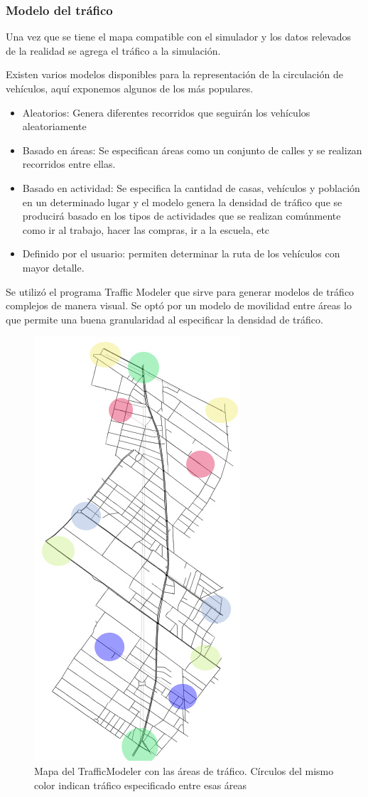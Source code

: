 \newpage
\subsubsection{Modelo del tráfico}
Una vez que se tiene el mapa compatible con el simulador y los datos relevados de la realidad se agrega el tráfico a la simulación.

Existen varios modelos disponibles para la representación de la circulación de vehículos, aquí exponemos algunos de los más populares. 
\begin{itemize}
	\item Aleatorios: Genera diferentes recorridos que seguirán los vehículos aleatoriamente
	\item Basado en áreas:  Se especifican áreas como un conjunto de calles y se realizan recorridos entre ellas.
	\item Basado en actividad: Se especifica la cantidad de casas, vehículos y población en un determinado lugar y el modelo genera la densidad de tráfico que se producirá basado en los tipos de actividades que se realizan comúnmente como ir al trabajo, hacer las compras, ir a la escuela,  etc
	\item Definido por el usuario: permiten determinar la ruta de los vehículos con mayor detalle.
\end{itemize}


Se utilizó el programa Traffic Modeler \citep{TrafficModeler} que sirve para generar modelos de tráfico complejos de manera visual. Se optó por un modelo de movilidad entre áreas lo que permite una buena granularidad al especificar la densidad de tráfico.


\begin{figure}[h]
	\centering
	\includegraphics[width=0.3\linewidth]{Figures/areaflow1}
	\caption{Mapa del TrafficModeler con las áreas de tráfico. Círculos del mismo color indican tráfico especificado entre esas áreas}
	\label{fig:areaflow1}
\end{figure}


